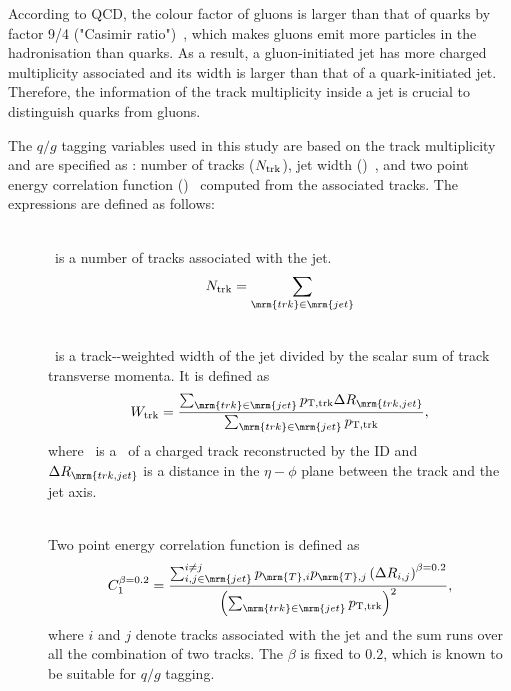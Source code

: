 According to QCD, the colour factor of gluons is larger than that of quarks by factor 9/4 ("Casimir ratio")~\cite{ALTARELLI1977298}, which makes gluons emit more particles in the hadronisation than quarks. As a result, a gluon-initiated jet has more charged multiplicity associated and its width is larger than that of a quark-initiated jet. Therefore, the information of the track multiplicity inside a jet is crucial to distinguish quarks from gluons.

The $q/g$ tagging variables used in this study are based on the track multiplicity and are specified as : number of tracks ($N_{\mathrm{trk}}$), jet width (\wtrk)~\cite{Aad_2014,PhysRevLett.110.212001}, and two point energy correlation function (\cbeta)~\cite{Moult:2016cvt,Larkoski:2013eya} computed from the associated tracks. The expressions are defined as follows:

\begin{description}

  \item[\ntrk] \mbox{} \\
    \ntrk~is a number of tracks associated with the jet. %
    \begin{equation}
    \ntrk = \sum_{\mrm{trk}\in\mrm{jet}}
    \end{equation}

  \item[\wtrk] \mbox{} \\
    \wtrk~is a track-\pt-weighted width of the jet divided by the scalar sum of track transverse momenta. %
    It is defined as %
    \begin{equation}
      \wtrk = \frac{ \sum_{\mrm{trk}\in\mrm{jet}}\pttrk\Delta R_{\mrm{trk,jet}} }{ \sum_{\mrm{trk}\in\mrm{jet}}\pttrk },
    \end{equation}
    where \pttrk~is a \pt~of a charged track reconstructed by the ID and %
    $\Delta R_{\mrm{trk,jet}}$ is a distance in the $\eta-\phi$ plane between the track and the jet axis. %

  \item[\cbeta] \mbox{} \\
    Two point energy correlation function is defined as %
    \begin{equation}
      \cbeta = \frac{ \sum_{i, j\in\mrm{jet}}^{i\neq j} p_{\mrm{T}, i}p_{\mrm{T}, j} \left( \Delta R_{i,j} \right)^{\beta=0.2} }%
        { \left( \sum_{\mrm{trk}\in\mrm{jet}} \pttrk  \right)^{2} }, 
    \end{equation}
    where $i$ and $j$ denote tracks associated with the jet and the sum runs over all the combination of two tracks. %
    The $\beta$ is fixed to $0.2$, which is known to be suitable for $q/g$ tagging.%

\end{description}

